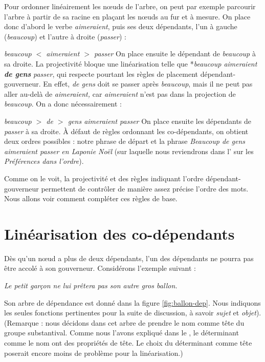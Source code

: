 Pour ordonner linéairement les nœuds de l’arbre, on peut par exemple parcourir l’arbre à partir de sa racine en plaçant les nœuds au fur et à mesure. On place donc d’abord le verbe \textit{aimeraient}, puis ses deux dépendants, l’un à gauche (\textit{beaucoup}) et l’autre à droite (\textit{passer}) :

\ea
    \textit{{beaucoup $<$ aimeraient $>$ passer}}
\z
On place ensuite le dépendant de \textit{beaucoup} à sa droite. La projectivité bloque une linéarisation telle que *\textit{beaucoup aimeraient} \textbf{\textit{de gens}} \textit{passer}, qui respecte pourtant les règles de placement dépendant-gouverneur. En effet, \textit{de gens} doit se passer après \textit{beaucoup}, mais il ne peut pas aller au-delà de \textit{aimeraient,} car \textit{aimeraient} n’est pas dans la projection de \textit{beaucoup}. On a donc nécessairement :

\ea
    \textit{{beaucoup $>$ de $>$ gens aimeraient passer}}
\z
On place ensuite les dépendants de \textit{passer} à sa droite. À défaut de règles ordonnant les co-dépendants, on obtient deux ordres possibles : notre phrase de départ et la phrase \textit{Beaucoup de gens aimeraient passer en Laponie Noël} (sur laquelle nous reviendrons dans l’ sur les \textit{Préférences dans l’ordre}).

Comme on le voit, la projectivité et des règles indiquant l’ordre dépendant-gouverneur permettent de contrôler de manière assez précise l’ordre des mots. Nous allons voir comment compléter ces règles de base.

\section{Linéarisation des co-dépendants}\label{sec:3.5.19}

Dès qu’un nœud a plus de deux dépendants, l’un des dépendants ne pourra pas être accolé à son gouverneur. Considérons l’exemple suivant :

\ea\label{ex:ballon}
\textit{{Le petit garçon ne lui prêtera pas son autre gros ballon}.}
\z

Son arbre de dépendance est donné dans la figure \ref{fig:ballon-dep}. Nous indiquons les seules fonctions pertinentes pour la suite de discussion, à savoir \textit{sujet} et \textit{objet}).
 (Remarque : nous décidons dans cet arbre de prendre le nom comme tête du groupe substantival. Comme nous l’avons expliqué dans le , le déterminant comme le nom ont des propriétés de tête. Le choix du déterminant comme tête poserait encore moins de problème pour la linéarisation.)


